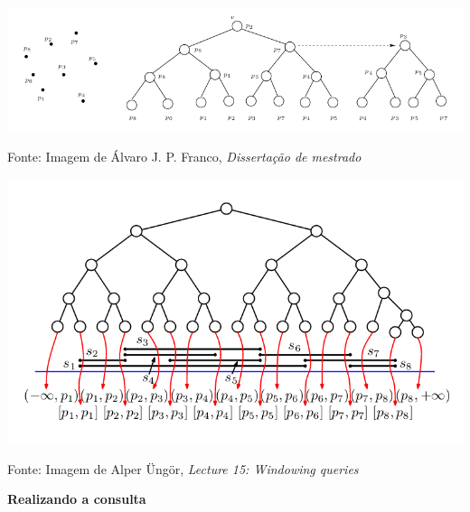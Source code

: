 \documentclass[
paper=128mm:96mm, %
fontsize=11pt, %
pagesize, %
parskip=half-, %
]{scrartcl} %
\theoremstyle{mythmstyle} %
\begin{document}
\includegraphics[width=\textwidth,height=0.6\textheight]{3}
\begin{flushleft}
\tiny Fonte: Imagem de Álvaro J. P. Franco, \emph{Dissertação de mestrado} \cite{junio09:MSc}
\normalsize
\end{flushleft}
\clearpage
\clearpage
\includegraphics[width=\textwidth,height=0.86\textheight]{4}
\begin{flushleft}
\tiny Fonte: Imagem de Alper Üngör, \emph{Lecture 15: Windowing queries} \cite{site3}
\normalsize
\end{flushleft}
\clearpage
\clearpage

\thispagestyle{empty} %

\begin{flushleft}
\vspace{0.6cm}
\color{white}\sffamily
{\bfseries\Huge Realizando a consulta\par} %
\vfill
\end{flushleft}
\end{document}
